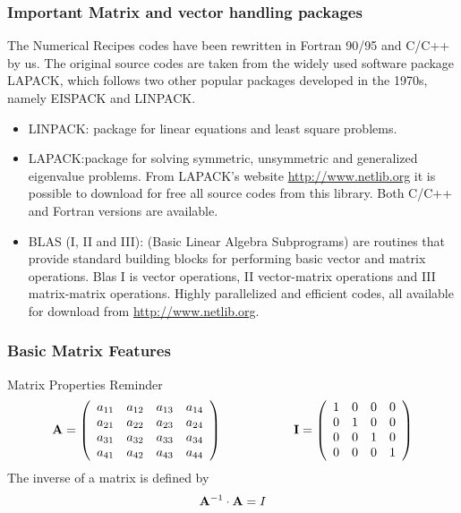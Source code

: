 \documentclass[compress]{beamer}
\begin{document}
\frame
{
  \frametitle{Important Matrix and vector handling packages}
\begin{small}
{\scriptsize
The Numerical Recipes codes have been rewritten in Fortran 90/95 and C/C++ by us.
The original source codes are taken from the widely used software
package LAPACK, which follows two other popular packages developed in the 1970s,
namely EISPACK
and LINPACK.
\begin{itemize}
\item LINPACK: package for linear equations
and least square problems.
\item LAPACK:package for solving symmetric, unsymmetric and generalized eigenvalue problems.
From LAPACK's website \url{http://www.netlib.org}  it is
possible to download for free all source codes from
this library. Both C/C++ and Fortran versions are available.
\item BLAS (I, II and III): (Basic Linear Algebra Subprograms)
are routines that provide standard building blocks for performing basic vector and matrix operations.
Blas I is vector operations, II vector-matrix operations and III matrix-matrix operations.
Highly parallelized and efficient codes, all available for download from
\url{http://www.netlib.org}.
\end{itemize}
}
\end{small}
}







\frame
{
  \frametitle{Basic Matrix Features}
  \begin{block}{Matrix Properties Reminder}
\[
 {\bf A} =
      \left( \begin{array}{cccc} a_{11} & a_{12} & a_{13} & a_{14} \\
                                 a_{21} & a_{22} & a_{23} & a_{24} \\
                                   a_{31} & a_{32} & a_{33} & a_{34} \\
                                  a_{41} & a_{42} & a_{43} & a_{44}
             \end{array} \right)
\hspace*{2cm} {\bf I} =
      \left( \begin{array}{cccc} 1 & 0 & 0 & 0 \\
                                 0 & 1 & 0 & 0 \\
                                 0 & 0 & 1 & 0 \\
                                 0 & 0 & 0 & 1
             \end{array} \right)
\]
%
The inverse of a matrix is defined by
%
\[
{\bf A}^{-1} \cdot {\bf A} = I
\]
  \end{block}
}
\end{document}
